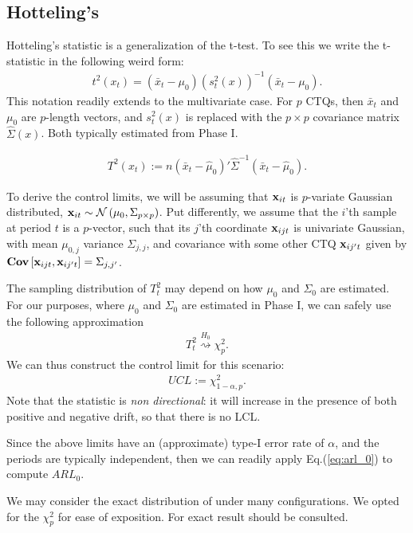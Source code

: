 \subsection{Hotteling's \tsq}
Hotteling's \tsq statistic is a generalization of the t-test.
To see this we write the t-statistic in the following weird form:
\begin{align}
	t^2(x_t)=(\bar{x}_t-\mu_0) (s^2_t(x))^{-1} (\bar{x}_t-\mu_0).
\end{align}
This notation readily extends to the multivariate case. 
For $p$ CTQs, then $\bar{x}_t$ and $\mu_0$ are $p$-length vectors, and $s^2_t(x)$ is replaced with the $p \times p$ covariance matrix $\hat{\Sigma}(x)$.
Both typically estimated from Phase I. 
\begin{definition}
\begin{align}
\label{eq:hotteling}
	T^2(x_t) := n (\bar{x}_t-\hat{\mu}_0)' \hat{\Sigma}^{-1} (\bar{x}_t-\hat{\mu}_0).
\end{align}
\end{definition}
To derive the control limits, we will be assuming that $\mathbf{x}_{it}$ is $p$-variate Gaussian distributed, $\mathbf{x}_{it}\sim \mathcal{N}\left(\mu_0, \Sigma_{p \times p}\right)$. 
Put differently, we assume that the $i$'th sample at period $t$ is a $p$-vector, such that its $j$'th coordinate $\mathbf{x}_{ijt}$ is univariate Gaussian, with mean $\mu_{0,j}$ variance $\Sigma_{j,j}$, and covariance with some other CTQ $\mathbf{x}_{ij't}$ given by $\mathbf{Cov} \left[ \mathbf{x}_{ijt},\mathbf{x}_{ij't} \right]=\Sigma_{j,j'}$. 

The sampling distribution of $T^2_t$ may depend on how $\mu_0$ and $\Sigma_0$ are estimated. 
For our purposes, where $\mu_0$ and $\Sigma_0$ are estimated in Phase I, we can safely use the following approximation
\begin{align}
	T^2_t \overset{H_0}{\rightsquigarrow }\chi^2_p.
\end{align}
We can thus construct the control limit for this scenario:
\begin{align}
	UCL:= \chi^2_{1-\alpha,p}.
\end{align}
Note that the \tsq statistic is \emph{non directional}: it will increase in the presence of both positive and negative drift, so that there is no LCL.

Since the above limits have an (approximate) type-I error rate of $\alpha$, and the periods are typically independent, then we can readily apply Eq.(\ref{eq:arl_0}) to compute $ARL_0$.

\begin{remark}
We may consider the exact distribution of \tsq under many configurations. 
We opted for the $\chi^2_p$ for ease of exposition. 
For exact result \cite[Ch.7]{qiu_introduction_2013} should be consulted. 
\end{remark}






